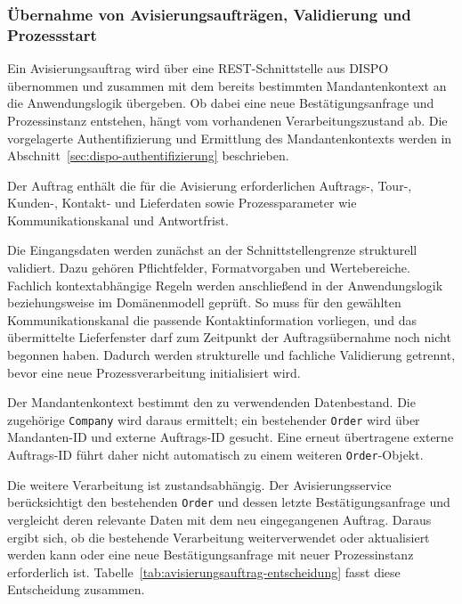 \documentclass[
  12pt,
  a4paper,
  oneside
]{article}
\begin{document}
\subsubsection{Übernahme von Avisierungsaufträgen, Validierung und Prozessstart}
\label{sec:auftragsuebernahme}

Ein Avisierungsauftrag wird über eine REST-Schnittstelle aus DISPO übernommen
und zusammen mit dem bereits bestimmten Mandantenkontext an die
Anwendungslogik übergeben. Ob dabei eine neue Bestätigungsanfrage und
Prozessinstanz entstehen, hängt vom vorhandenen Verarbeitungszustand ab. Die
vorgelagerte Authentifizierung und Ermittlung des Mandantenkontexts werden in
Abschnitt~\ref{sec:dispo-authentifizierung} beschrieben.

Der Auftrag enthält die für die Avisierung erforderlichen Auftrags-, Tour-,
Kunden-, Kontakt- und Lieferdaten sowie Prozessparameter wie
Kommunikationskanal und Antwortfrist.

Die Eingangsdaten werden zunächst an der Schnittstellengrenze strukturell
validiert. Dazu gehören Pflichtfelder, Formatvorgaben und Wertebereiche.
Fachlich kontextabhängige Regeln werden anschließend in der Anwendungslogik
beziehungsweise im Domänenmodell geprüft. So muss für den gewählten
Kommunikationskanal die passende Kontaktinformation vorliegen, und das
übermittelte Lieferfenster darf zum Zeitpunkt der Auftragsübernahme noch nicht
begonnen haben. Dadurch werden strukturelle und fachliche Validierung getrennt,
bevor eine neue Prozessverarbeitung initialisiert wird.

Der Mandantenkontext bestimmt den zu verwendenden Datenbestand. Die zugehörige
\texttt{Company} wird daraus ermittelt; ein bestehender \texttt{Order} wird
über Mandanten-ID und externe Auftrags-ID gesucht. Eine erneut übertragene
externe Auftrags-ID führt daher nicht automatisch zu einem weiteren
\texttt{Order}-Objekt.

Die weitere Verarbeitung ist zustandsabhängig. Der Avisierungsservice
berücksichtigt den bestehenden \texttt{Order} und dessen letzte
Bestätigungsanfrage und vergleicht deren relevante Daten mit dem neu
eingegangenen Auftrag. Daraus ergibt sich, ob die bestehende Verarbeitung
weiterverwendet oder aktualisiert werden kann oder eine neue
Bestätigungsanfrage mit neuer Prozessinstanz erforderlich ist.
Tabelle~\ref{tab:avisierungsauftrag-entscheidung} fasst diese Entscheidung
zusammen.
\end{document}
